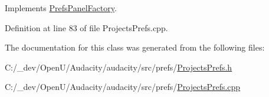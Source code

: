 Implements \hyperlink{class_prefs_panel_factory_a4814184d6050665a43f4929caa73aa0c}{Prefs\+Panel\+Factory}.



Definition at line 83 of file Projects\+Prefs.\+cpp.



The documentation for this class was generated from the following files\+:\begin{DoxyCompactItemize}
\item 
C\+:/\+\_\+dev/\+Open\+U/\+Audacity/audacity/src/prefs/\hyperlink{_projects_prefs_8h}{Projects\+Prefs.\+h}\item 
C\+:/\+\_\+dev/\+Open\+U/\+Audacity/audacity/src/prefs/\hyperlink{_projects_prefs_8cpp}{Projects\+Prefs.\+cpp}\end{DoxyCompactItemize}
